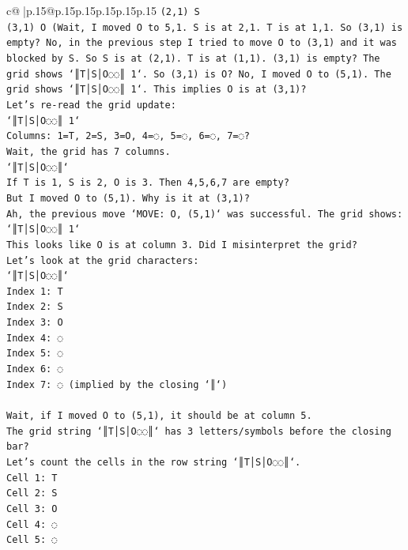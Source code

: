 \documentclass{article}
\begin{document}
{\begin{supertabular}{c@{$\;$}|p{.15\linewidth}@{}p{.15\linewidth}p{.15\linewidth}p{.15\linewidth}p{.15\linewidth}p{.15\linewidth}}
{{{\texttt{(2,1) S} \\
\texttt{(3,1) O (Wait, I moved O to 5,1. S is at 2,1. T is at 1,1. So (3,1) is empty? No, in the previous step I tried to move O to (3,1) and it was blocked by S. So S is at (2,1). T is at (1,1). (3,1) is empty? The grid shows `║T│S│O◌◌║ 1`. So (3,1) is O? No, I moved O to (5,1). The grid shows `║T│S│O◌◌║ 1`. This implies O is at (3,1)?} \\
\texttt{Let's re{-}read the grid update:} \\
\texttt{`║T│S│O◌◌║ 1`} \\
\texttt{Columns: 1=T, 2=S, 3=O, 4=◌, 5=◌, 6=◌, 7=◌?} \\
\texttt{Wait, the grid has 7 columns.} \\
\texttt{`║T│S│O◌◌║`} \\
\texttt{If T is 1, S is 2, O is 3. Then 4,5,6,7 are empty?} \\
\texttt{But I moved O to (5,1). Why is it at (3,1)?} \\
\texttt{Ah, the previous move `MOVE: O, (5,1)` was successful. The grid shows:} \\
\texttt{`║T│S│O◌◌║ 1`} \\
\texttt{This looks like O is at column 3. Did I misinterpret the grid?} \\
\texttt{Let's look at the grid characters:} \\
\texttt{`║T│S│O◌◌║`} \\
\texttt{Index 1: T} \\
\texttt{Index 2: S} \\
\texttt{Index 3: O} \\
\texttt{Index 4: ◌} \\
\texttt{Index 5: ◌} \\
\texttt{Index 6: ◌} \\
\texttt{Index 7: ◌ (implied by the closing `║`)} \\
\\ 
\texttt{Wait, if I moved O to (5,1), it should be at column 5.} \\
\texttt{The grid string `║T│S│O◌◌║` has 3 letters/symbols before the closing bar?} \\
\texttt{Let's count the cells in the row string `║T│S│O◌◌║`.} \\
\texttt{Cell 1: T} \\
\texttt{Cell 2: S} \\
\texttt{Cell 3: O} \\
\texttt{Cell 4: ◌} \\
\texttt{Cell 5: ◌} \\
}}}
\end{supertabular}}
\end{document}
